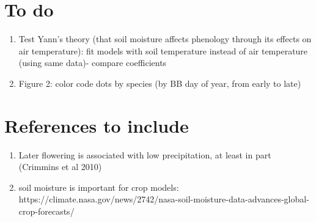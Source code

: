 \documentclass{article}
\begin{document}
\section* {To do}
\begin{enumerate}
\item Test Yann's theory (that soil moisture affects phenology through its effects on air temperature): fit models with soil temperature instead of air temperature (using same data)- compare coefficients

\item Figure 2: color code dots by species (by BB day of year, from early to late)
\end{enumerate}
\section*{References to include}
\begin{enumerate}
\item Later flowering is  associated with low precipitation, at least in part (Crimmins et al 2010)
\item soil moisture is important for crop models: https://climate.nasa.gov/news/2742/nasa-soil-moisture-data-advances-global-crop-forecasts/


\end{enumerate}
\end{document}
